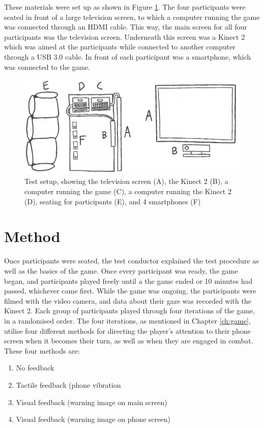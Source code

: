 These materials were set up as shown in Figure \ref{fig:test_setup}. The four participants were seated in front of a large television screen, to which a computer running the game was connected through an HDMI cable. This way, the main screen for all four participants was the television screen. Underneath this screen was a Kinect 2 which was aimed at the participants while connected to another computer through a USB 3.0 cable. In front of each participant was a smartphone, which was connected to the game.

\begin{figure}[h!]
	\centering
	\includegraphics[width=\textwidth]{figures/test_setup.png}
	\caption{Test setup, showing the television screen (A), the Kinect 2 (B), a computer running the game (C), a computer running the Kinect 2 (D), seating for participants (E), and 4 smartphones (F)}\label{fig:test_setup}
\end{figure}

\section{Method}
Once participants were seated, the test conductor explained the test procedure as well as the basics of the game. Once every participant was ready, the game began, and participants played freely until a the game ended or 10 minutes had passed, whichever came first. While the game was ongoing, the participants were filmed with the video camera, and data about their gaze was recorded with the Kinect 2. Each group of participants played through four iterations of the game, in a randomised order. The four iterations, as mentioned in Chapter \ref{ch:game}, utilise four different methods for directing the player's attention to their phone screen when it becomes their turn, as well as when they are engaged in combat. These four methods are:

\begin{enumerate}[label=\Alph*)]
	\item No feedback
	\item Tactile feedback (phone vibration
	\item Visual feedback (warning image on main screen)
	\item Visual feedback (warning image on phone screen)
\end{enumerate}

